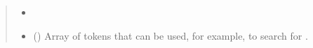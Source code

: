 \documentclass[letterpaper,10pt,english]{sphinxmanual}
\begin{document}
\begin{fulllineitems}
\begin{quote}
\begin{description}
\begin{itemize}
\item {} 

\item {} 
 () \textendash{} Array of tokens that can be used, for example, to search for
.

\end{itemize}


\end{description}\end{quote}




{\hyperref[\detokenize{functions:pyresid.get_sections_text}]{}}



\end{fulllineitems}

\end{document}
